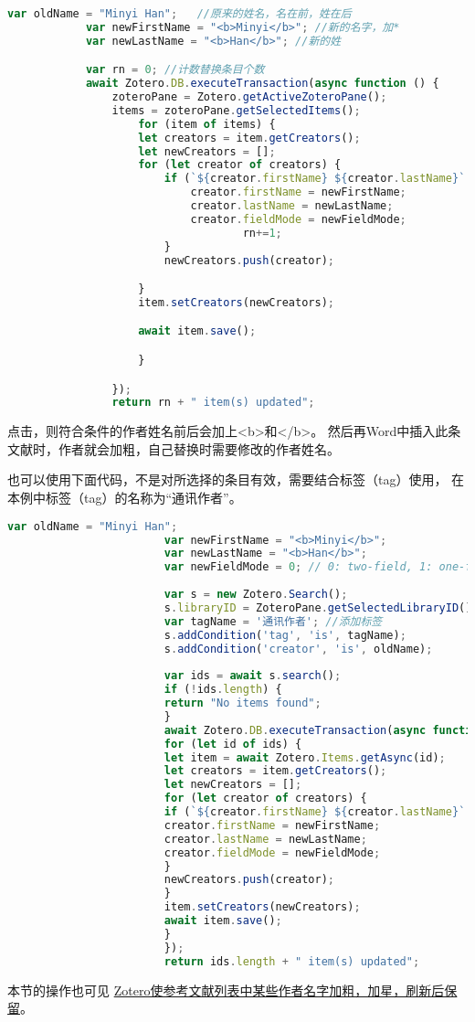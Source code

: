 \documentclass[cn,11pt,chinese]{elegantbook}
\begin{document}
		\begin{lstlisting}[language=JavaScript]
			var oldName = "Minyi Han";   //原来的姓名，名在前，姓在后
			var newFirstName = "<b>Minyi</b>"; //新的名字，加*
			var newLastName = "<b>Han</b>"; //新的姓

			var rn = 0; //计数替换条目个数
			await Zotero.DB.executeTransaction(async function () {
				zoteroPane = Zotero.getActiveZoteroPane();
				items = zoteroPane.getSelectedItems();
					for (item of items) {
					let creators = item.getCreators();
					let newCreators = [];
					for (let creator of creators) {
						if (`${creator.firstName} ${creator.lastName}`.trim() == oldName) {
							creator.firstName = newFirstName;
							creator.lastName = newLastName;
							creator.fieldMode = newFieldMode;
									rn+=1;
						}
						newCreators.push(creator);

					}
					item.setCreators(newCreators);

					await item.save();

					}

				}); 
				return rn + " item(s) updated";
				\end{lstlisting}
			点击，则符合条件的作者姓名前后会加上<b>和</b>。
			然后再Word中插入此条文献时，作者就会加粗，自己替换时需要修改的作者姓名。

			也可以使用下面代码，不是对所选择的条目有效，需要结合标签（tag）使用，
			在本例中标签（tag）的名称为“通讯作者”。
					\begin{lstlisting}[language=JavaScript]
						var oldName = "Minyi Han";
						var newFirstName = "<b>Minyi</b>";
						var newLastName = "<b>Han</b>";
						var newFieldMode = 0; // 0: two-field, 1: one-field (with empty first name)
						
						var s = new Zotero.Search();
						s.libraryID = ZoteroPane.getSelectedLibraryID();
						var tagName = '通讯作者'; //添加标签
						s.addCondition('tag', 'is', tagName);
						s.addCondition('creator', 'is', oldName);
						
						var ids = await s.search();
						if (!ids.length) {
						return "No items found";
						}
						await Zotero.DB.executeTransaction(async function () {
						for (let id of ids) {
						let item = await Zotero.Items.getAsync(id);
						let creators = item.getCreators();
						let newCreators = [];
						for (let creator of creators) {
						if (`${creator.firstName} ${creator.lastName}`.trim() == oldName) {
						creator.firstName = newFirstName;
						creator.lastName = newLastName;
						creator.fieldMode = newFieldMode;
						}
						newCreators.push(creator);
						}
						item.setCreators(newCreators);
						await item.save();
						}
						});
						return ids.length + " item(s) updated";
						\end{lstlisting}
				本节的操作也可见
				\href{https://zhuanlan.zhihu.com/p/353770101}
				{Zotero使参考文献列表中某些作者名字加粗，加星，刷新后保留}。
\end{document}
